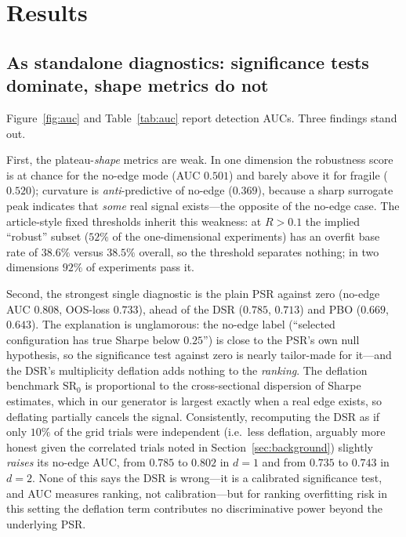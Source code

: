 \documentclass[11pt]{article}
\newcommand{\sr}{\mathrm{SR}}
\begin{document}
\section{Results}

\subsection{As standalone diagnostics: significance tests dominate, shape metrics do not}
\label{sec:diagnostic}

Figure~\ref{fig:auc} and Table~\ref{tab:auc} report detection AUCs. Three
findings stand out.

First, the plateau-\emph{shape} metrics are weak. In one dimension the
robustness score is at chance for the no-edge mode (AUC $0.501$) and barely
above it for fragile ($0.520$); curvature is \emph{anti}-predictive of no-edge
($0.369$), because a sharp surrogate peak indicates that \emph{some} real signal
exists---the opposite of the no-edge case. The article-style fixed thresholds
inherit this weakness: at $R>0.1$ the implied ``robust'' subset ($52\%$ of the
one-dimensional experiments) has an overfit base rate of $38.6\%$ versus
$38.5\%$ overall, so the threshold separates nothing; in two dimensions $92\%$
of experiments pass it.

Second, the strongest single diagnostic is the plain PSR against zero (no-edge
AUC $0.808$, OOS-loss $0.733$), ahead of the DSR ($0.785$, $0.713$) and PBO
($0.669$, $0.643$). The explanation is unglamorous: the no-edge label
(``selected configuration has true Sharpe below $0.25$'') is close to the PSR's
own null hypothesis, so the significance test against zero is nearly tailor-made
for it---and the DSR's multiplicity deflation adds nothing to the \emph{ranking}.
The deflation benchmark $\sr_0$ is proportional to the cross-sectional
dispersion of Sharpe estimates, which in our generator is largest exactly when a
real edge exists, so deflating partially cancels the signal. Consistently,
recomputing the DSR as if only $10\%$ of the grid trials were independent
(i.e.\ less deflation, arguably more honest given the correlated trials noted in
Section~\ref{sec:background}) slightly \emph{raises} its no-edge AUC, from
$0.785$ to $0.802$ in $d{=}1$ and from $0.735$ to $0.743$ in $d{=}2$. None of
this says the DSR is wrong---it is a calibrated significance test, and AUC
measures ranking, not calibration---but for ranking overfitting risk in this
setting the deflation term contributes no discriminative power beyond the
underlying PSR.
\end{document}
